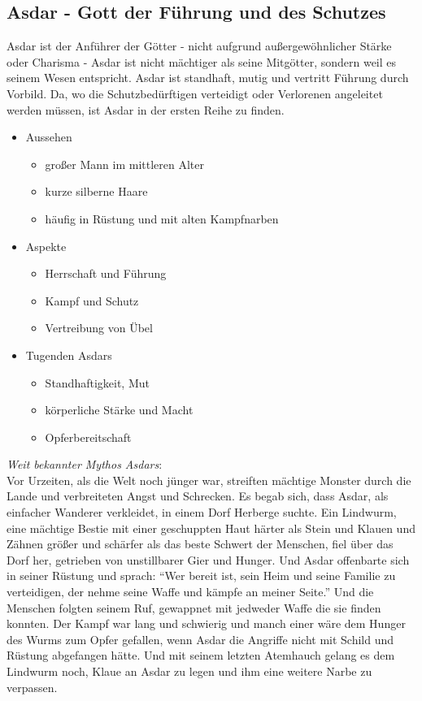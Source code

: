 \subsection{\textbf{Asdar} - Gott der Führung und des Schutzes}
Asdar ist der Anführer der Götter - nicht aufgrund außergewöhnlicher Stärke oder Charisma - Asdar ist nicht mächtiger als seine Mitgötter, sondern weil es seinem Wesen entspricht. Asdar ist standhaft, mutig und 
vertritt Führung durch Vorbild. Da, wo die Schutzbedürftigen verteidigt oder Verlorenen angeleitet werden müssen, ist Asdar in der ersten Reihe zu finden. \\
\begin{itemize}
	\item Aussehen 
	\begin{itemize}
		\item großer Mann im mittleren Alter
		\item kurze silberne Haare
		\item häufig in Rüstung und mit alten Kampfnarben
	\end{itemize}
	\item Aspekte
	\begin{itemize}
		\item Herrschaft und Führung
		\item Kampf und Schutz
		\item Vertreibung von Übel
	\end{itemize}
	\item Tugenden Asdars
	\begin{itemize}
		\item Standhaftigkeit, Mut
		\item körperliche Stärke und Macht
		\item Opferbereitschaft
	\end{itemize}
\end{itemize}
\textit{Weit bekannter Mythos Asdars}:\\
Vor Urzeiten, als die Welt noch jünger war, streiften mächtige Monster durch die Lande und verbreiteten Angst und Schrecken. Es begab sich, dass Asdar, als einfacher Wanderer 
verkleidet, in einem Dorf Herberge suchte. Ein Lindwurm, eine mächtige Bestie mit einer geschuppten Haut härter als Stein und Klauen und Zähnen größer und schärfer als das 
beste Schwert der Menschen, fiel über das Dorf her, getrieben von unstillbarer Gier und Hunger. Und Asdar offenbarte sich in seiner Rüstung und sprach: ``Wer bereit ist, sein Heim 
und seine Familie zu verteidigen, der nehme seine Waffe und kämpfe an meiner Seite.'' Und die Menschen folgten seinem Ruf, gewappnet mit jedweder Waffe die sie finden konnten. 
Der Kampf war lang und schwierig und manch einer wäre dem Hunger des Wurms zum Opfer gefallen, wenn Asdar die Angriffe nicht mit Schild und Rüstung abgefangen hätte. Und 
mit seinem letzten Atemhauch gelang es dem Lindwurm noch, Klaue an Asdar zu legen und ihm eine weitere Narbe zu verpassen.

